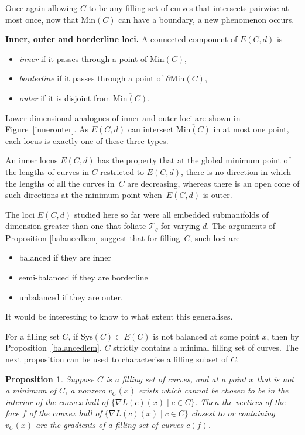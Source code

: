 \documentclass[11pt]{article}
\numberwithin{equation}{section}
\numberwithin{equation}{section}
\newtheorem{Proposition}[Theorem]{Proposition}
\begin{document}
Once again allowing $C$ to be any filling set of curves that intersects pairwise at most once, now that $\mathrm{Min}(C)$ can have a boundary, a new phenomenon occurs.

\textbf{Inner, outer and borderline loci.} A connected component of $E(C,d)$ is
\begin{itemize}\itemsep=0pt
\item\textit{inner} if it passes through a point of $\mathrm{Min}(C)$,
\item\textit{borderline} if it passes through a point of $\partial \mathrm{Min}(C)$,
\item\textit{outer} if it is disjoint from $\overline{\mathrm{Min}(C)}$.
\end{itemize}
Lower-dimensional analogues of inner and outer loci are shown in Figure~\ref{innerouter}. As $E(C,d)$ can intersect $\overline{\mathrm{Min}(C)}$ in at most one point, each locus is exactly one of these three types.

An inner locus $E(C, d)$ has the property that at the global minimum point of the lengths of curves in $C$ restricted to $E(C, d)$, there is no direction in which the lengths of all the curves in~$C$ are decreasing, whereas there is an open cone of such directions at the minimum point when~$E(C, d)$ is outer.

The loci $E(C,d)$ studied here so far were all embedded submanifolds of dimension greater than one that foliate $\mathcal{T}_{g}$ for varying $d$. The arguments of Proposition \ref{balancedlem} suggest that for filling~$C$, such loci are
\begin{itemize}\itemsep=0pt
\item balanced if they are inner
\item semi-balanced if they are borderline
\item unbalanced if they are outer.
\end{itemize}
It would be interesting to know to what extent this generalises.

For a filling set $C$, if $\mathrm{Sys}(C)\subset E(C)$ is not balanced at some point $x$, then by Proposition~\ref{balancedlem}, $C$ strictly contains a minimal filling set of curves. The next proposition can be used to characterise a filling subset of $C$.

\begin{Proposition}
\label{plus1}
Suppose $C$ is a filling set of curves, and at a point $x$ that is not a minimum of $C$, a nonzero $v_{C}(x)$ exists which cannot be chosen to be in the interior of the convex hull of $\{\nabla L(c)(x) \mid c\in C\}$. Then the vertices of the face $f$ of the convex hull of $\{\nabla L(c)(x) \mid c\in C\}$ closest to or containing $v_{C}(x)$ are the gradients of a filling set of curves $c(f)$.
\end{Proposition}
\end{document}
